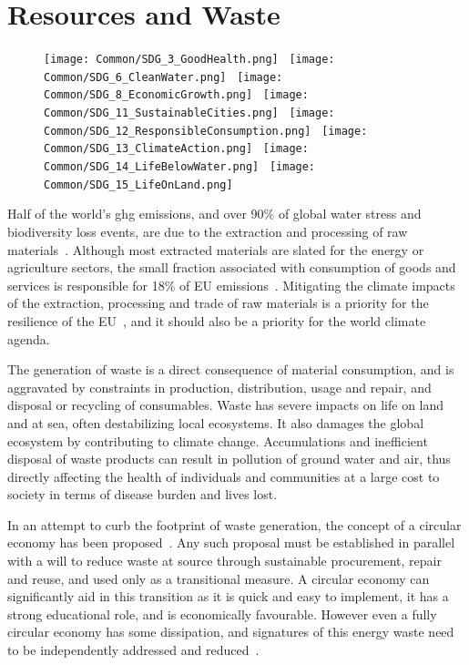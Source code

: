 \documentclass[../SustainableHEP.tex]{subfiles}
\begin{document}
\RaggedRight
\sloppy
\newpage


\section{Resources and Waste}
\label{sec:Waste}


\begin{figure}
\texttt{[image: Common/SDG\_3\_GoodHealth.png]}~
\texttt{[image: Common/SDG\_6\_CleanWater.png]}~
\texttt{[image: Common/SDG\_8\_EconomicGrowth.png]}~
\texttt{[image: Common/SDG\_11\_SustainableCities.png]}~
\texttt{[image: Common/SDG\_12\_ResponsibleConsumption.png]}~
\texttt{[image: Common/SDG\_13\_ClimateAction.png]}~
\texttt{[image: Common/SDG\_14\_LifeBelowWater.png]}~
\texttt{[image: Common/SDG\_15\_LifeOnLand.png]}
\end{figure}


\noindent Half of the world's \acrshort{ghg} emissions, and over 90\% of global water stress and biodiversity loss events, are due to the extraction and processing of raw materials~\cite{EURaw}. Although most extracted materials are slated for the energy or agriculture sectors, the small fraction associated with consumption of goods and services is responsible for 18\% of EU emissions~\cite{EURaw}. Mitigating the climate impacts of the extraction, processing and trade of raw materials is a priority for the resilience of the EU~\cite{EURaw}, and it should also be a priority for the world climate agenda.

The generation of waste is a direct consequence of material consumption, and is aggravated by constraints in production, distribution, usage and repair, and disposal or recycling of consumables. Waste has severe impacts on life on land and at sea, often destabilizing local ecosystems.  It also damages the global ecosystem by contributing to climate change. Accumulations and inefficient disposal of waste products can result in pollution of ground water and air, thus directly affecting the health of individuals and communities at a large cost to society in terms of disease burden and lives lost. 

In an attempt to curb the footprint of waste generation, the concept of a circular economy has been  proposed~\cite{CircularEconomy}.  Any such proposal must be established in parallel with a will to reduce waste at source through sustainable procurement, repair and reuse, and used only as a transitional measure.  A circular economy can significantly aid in this transition as it is quick and easy to implement, it has a strong educational role, and is economically favourable.  However even a fully circular economy has some dissipation, and signatures of this energy waste need to be independently addressed and reduced~\cite{Forbes,SocialEurope,WRI}.
\end{document}

